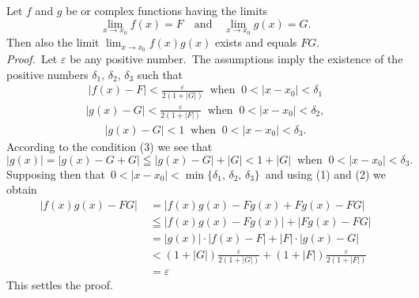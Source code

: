 \documentclass[12pt]{article}
\theoremstyle{definition}
\begin{document}
Let $f$ and $g$ be  or complex functions having the limits
$$\lim_{x\to x_0}f(x) = F \quad \mbox{and} \quad \lim_{x\to x_0}g(x) = G.$$
Then also the limit $\displaystyle\lim_{x\to x_0}f(x)g(x)$ exists and equals $FG$.\\

{\em Proof.}\, Let $\varepsilon$ be any positive number.\, The assumptions imply the existence of the positive numbers $\delta_1,\,\delta_2,\,\delta_3$ such that
\begin{align}
|f(x)-F| < \frac{\varepsilon}{2(1+|G|)}\;\;\mbox{when}\;\;0 < |x-x_0| < \delta_1
\end{align}
\begin{align}
|g(x)-G| < \frac{\varepsilon}{2(1+|F|)}\;\;\mbox{when}\;\;0 < |x-x_0| < \delta_2,
\end{align}
\begin{align}
|g(x)-G| < 1\;\;\mbox{when}\;\;0 < |x-x_0| < \delta_3.
\end{align}
According to the condition (3) we see that
$$|g(x)| = |g(x)\!-\!G\!+\!G| \leqq |g(x)\!-\!G|+|G| < 1\!+\!|G|\;\;\mbox{when}\;\;0 < |x-x_0| < \delta_3.$$
Supposing then that\, $0 < |x-x_0| < \min\{\delta_1,\,\delta_2,\,\delta_3\}$\, and using (1) and (2) we obtain
\begin{align*}
|f(x)g(x)-FG|\;& = |f(x)g(x)-Fg(x)+Fg(x)-FG|\\
               & \leqq |f(x)g(x)\!-\!Fg(x)|+|Fg(x)\!-\!FG|\\
               & = |g(x)|\cdot|f(x)\!-\!F|+|F|\cdot|g(x)\!-\!G|\\
               & < (1\!+\!|G|)\frac{\varepsilon}{2(1\!+\!|G|)}+(1\!+\!|F|)\frac{\varepsilon}{2(1\!+\!|F|)}\\ 
               & = \varepsilon
\end{align*}
This settles the proof.



\end{document}
